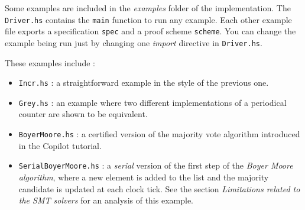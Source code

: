 Some examples are included in the \emph{examples} folder of the implementation. The \texttt{Driver.hs}
contains the \texttt{main} function to run any example. Each other
example file exports a specification \texttt{spec} and a proof scheme
\texttt{scheme}. You can change the example being run just by changing
one \emph{import} directive in \texttt{Driver.hs}.

These examples include :

\begin{itemize}
\itemsep1pt\parskip0pt
\item
  \texttt{Incr.hs} : a straightforward example in the style of the
  previous one.
\item
  \texttt{Grey.hs} : an example where two different implementations of a
  periodical counter are shown to be equivalent.
\item
  \texttt{BoyerMoore.hs} : a certified version of the majority vote
  algorithm introduced in the Copilot tutorial.
\item
  \texttt{SerialBoyerMoore.hs} : a \emph{serial} version of the first
  step of the \emph{Boyer Moore algorithm}, where a new element is added
  to the list and the majority candidate is updated at each clock tick.
  See the section \emph{Limitations related to the SMT solvers} for an
  analysis of this example.
\end{itemize}

